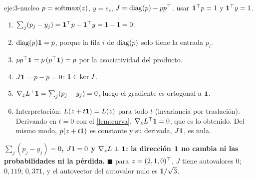 \begin{solucion}{eje:3-nucleo}
\datos $p=\operatorname{softmax}(z)$, $y=e_c$, $J=\operatorname{diag}(p)-pp^{\top}$.
\planteamiento usar $\mathbf{1}^{\top} p=1$ y $\mathbf{1}^{\top} y=1$.
\pasos
\begin{enumerate}[label=\arabic*.]
  \item $\sum_j(p_j-y_j)=\mathbf{1}^{\top} p-\mathbf{1}^{\top} y=1-1=0$.
  \item $\operatorname{diag}(p)\mathbf{1}=p$, porque la fila $i$ de $\operatorname{diag}(p)$ solo tiene la entrada $p_i$.
  \item $pp^{\top}\mathbf{1}=p\,(p^{\top}\mathbf{1})=p$ por la asociatividad del producto.
  \item $J\mathbf{1}=p-p=0$: $\mathbf{1}\in\ker J$.
  \item $\nabla_zL^{\top}\mathbf{1}=\sum_j(p_j-y_j)=0$, luego el gradiente es ortogonal a $\mathbf{1}$.
  \item Interpretación: $L(z+t\mathbf{1})=L(z)$ para todo $t$ (invariancia por traslación). Derivando en $t=0$ con el \cref{lem:curva}, $\nabla_zL^{\top}\mathbf{1}=0$, que es lo obtenido. Del mismo modo, $p(z+t\mathbf{1})$ es constante y su derivada, $J\mathbf{1}$, es nula.
\end{enumerate}
\resultado \textbf{$\sum_j(p_j-y_j)=0$, $J\mathbf{1}=0$ y $\nabla_zL\perp\mathbf{1}$: la dirección $\mathbf{1}$ no cambia ni las probabilidades ni la pérdida.} $\blacksquare$
\comprobacion para $z=(2,1,0)^{\top}$, $J$ tiene autovalores $0$; $0{,}119$; $0{,}371$, y el autovector del autovalor nulo es $\mathbf{1}/\sqrt3$.
\end{solucion}

